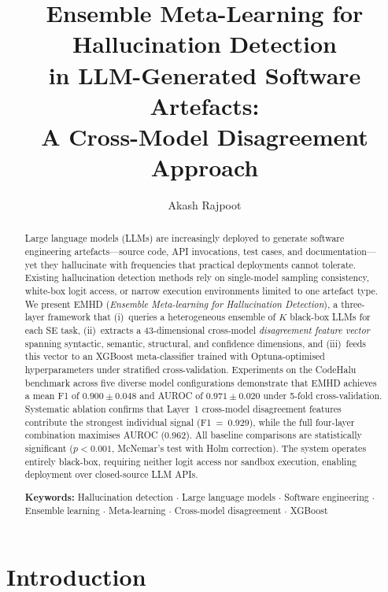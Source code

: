 \documentclass[11pt,a4paper]{article}
\newcommand{\method}{\textsc{EMHD}}
\begin{document}
\title{Ensemble Meta-Learning for Hallucination Detection\\in LLM-Generated Software Artefacts:\\A Cross-Model Disagreement Approach}

\author{Akash Rajpoot}

\date{}
\maketitle

\begin{abstract}
Large language models (LLMs) are increasingly deployed to generate software engineering artefacts---source code, API invocations, test cases, and documentation---yet they hallucinate with frequencies that practical deployments cannot tolerate. Existing hallucination detection methods rely on single-model sampling consistency, white-box logit access, or narrow execution environments limited to one artefact type. We present \method{} (\textit{Ensemble Meta-learning for Hallucination Detection}), a three-layer framework that (i)~queries a heterogeneous ensemble of $K$ black-box LLMs for each SE task, (ii)~extracts a 43-dimensional cross-model \emph{disagreement feature vector} spanning syntactic, semantic, structural, and confidence dimensions, and (iii)~feeds this vector to an XGBoost meta-classifier trained with Optuna-optimised hyperparameters under stratified cross-validation. Experiments on the CodeHalu benchmark across five diverse model configurations demonstrate that \method{} achieves a mean F1 of $0.900 \pm 0.048$ and AUROC of $0.971 \pm 0.020$ under 5-fold cross-validation. Systematic ablation confirms that Layer~1 cross-model disagreement features contribute the strongest individual signal (F1~=~0.929), while the full four-layer combination maximises AUROC (0.962). All baseline comparisons are statistically significant ($p < 0.001$, McNemar's test with Holm correction). The system operates entirely black-box, requiring neither logit access nor sandbox execution, enabling deployment over closed-source LLM APIs.

\smallskip
\noindent\textbf{Keywords:} Hallucination detection $\cdot$ Large language models $\cdot$ Software engineering $\cdot$ Ensemble learning $\cdot$ Meta-learning $\cdot$ Cross-model disagreement $\cdot$ XGBoost
\end{abstract}

\section{Introduction}
\label{sec:intro}
\end{document}
